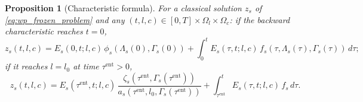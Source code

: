 \documentclass[pdflatex,sn-mathphys-num]{sn-jnl}%
\newtheorem{proposition}[theorem]{Proposition}
\begin{document}
\begin{proposition}[Characteristic formula]\label{prop:appA_representation}
For a classical solution \(z_s\) of \eqref{eq:wp_frozen_problem} and any
\((t,l,c)\in[0,T]\times\Omega_l\times\Omega_c\):
if the backward characteristic reaches \(t=0\),
\begin{equation}\label{eq:appA_rep_init}
z_s(t,l,c)
=
E_s(0,t;l,c)\,\phi_s(\Lambda_s(0),\Gamma_s(0))
+\int_0^t E_s(\tau,t;l,c)\,f_s(\tau,\Lambda_s(\tau),\Gamma_s(\tau))\,d\tau;
\end{equation}
if it reaches \(l=l_0\) at time \(\tau^{\mathrm{ent}}>0\),
\begin{equation}\label{eq:appA_rep_boundary}
z_s(t,l,c)
=
E_s(\tau^{\mathrm{ent}},t;l,c)\,
\frac{\zeta_s(\tau^{\mathrm{ent}},\Gamma_s(\tau^{\mathrm{ent}}))}
{a_s(\tau^{\mathrm{ent}},l_0,\Gamma_s(\tau^{\mathrm{ent}}))}
+\int_{\tau^{\mathrm{ent}}}^t E_s(\tau,t;l,c)\,f_s\,d\tau.
\end{equation}
\end{proposition}
\end{document}
